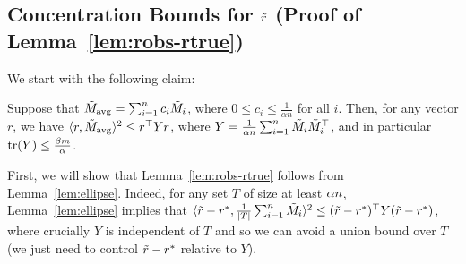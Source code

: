 \subsection{Concentration Bounds for $\tilde{r}$ (Proof of Lemma~\ref{lem:robs-rtrue})}
\label{sec:concentration-proof}

We start with the following claim:
\newcommand{\avg}{\mathrm{avg}}
\begin{lemma}
\label{lem:ellipse}
Suppose that $\M_{\avg} = \sum_{i=1}^n c_i \M_i$, where 
$0 \leq c_i \leq \frac{1}{\alpha n}$ for all $i$. 
Then, for any vector $r$, we have $\langle r, \M_{\avg} \rangle^2 
\leq r^{\top}Yr$, where $Y = \frac{1}{\alpha n} \sum_{i=1}^n \tilde{M}_i\tilde{M}_i^{\top}$, 
and in particular $\operatorname*{tr}(Y) \leq \frac{\beta m}{\alpha}$.
\end{lemma}
First, we will show that Lemma~\ref{lem:robs-rtrue} follows from 
Lemma~\ref{lem:ellipse}.
Indeed, for any set $T$ of size at least $\alpha n$, Lemma~\ref{lem:ellipse} 
implies that $\langle \tilde{r} - r^*, \frac{1}{|T|} \sum_{i=1}^n \tilde{M}_i \rangle^2 
\leq (\tilde{r} - r^*)^{\top}Y(\tilde{r} - r^*)$, where crucially $Y$ is independent 
of $T$ and so we can avoid a union bound over $T$ (we just need to control $\tilde{r}-r^*$ 
relative to $Y$).

